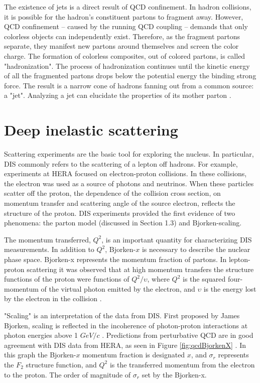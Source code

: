 The existence of jets is a direct result of QCD confinement. In hadron collisions, it is possible for the hadron's constituent partons to fragment away. However, QCD confinement -- caused by the running QCD coupling -- demands that only colorless objects can independently exist. Therefore, as the fragment partons separate, they manifest new partons around themselves and screen the color charge. The formation of colorless composites, out of colored partons, is called "hadronization". The process of hadronization continues until the kinetic energy of all the fragmented partons drops below the potential energy the binding strong force. The result is a narrow cone of hadrons fanning out from a common source: a "jet". Analyzing a jet can elucidate the properties of its mother parton \cite{d'Enterria:2004nv}.  

\section{Deep inelastic scattering}

Scattering experiments are the basic tool for exploring the nucleus. In particular, DIS commonly refers to the scattering of a lepton off hadrons. For example, experiments at HERA focused on electron-proton collisions. In these collisions, the electron was used as a source of photons and neutrinos. When these particles scatter off the proton, the dependence of the collision cross section, on momentum transfer and scattering angle of the source electron, reflects the structure of the proton. DIS experiments provided the first evidence of two phenomena: the parton model (discussed in Section 1.3) and Bjorken-scaling. 

The momentum transferred, $Q^2$, is an important quantity for characterizing DIS measurements. In addition to $Q^2$, Bjorken-$x$ is necessary to describe the nuclear phase space. Bjorken-x represents the momentum fraction of partons. In lepton-proton scattering it was observed that at high momentum transfers the structure functions of the proton were functions of $Q^2/\upsilon$, where $Q^2$ is the squared four-momentum of the virtual photon emitted by the electron, and $\upsilon$ is the energy lost by the electron in the collision \cite{Bjorken:1968dy}. 

"Scaling" is an interpretation of the data from DIS. First proposed by James Bjorken, scaling is reflected in the incoherence of photon-proton interactions at photon energies above 1 $GeV/c$ \cite{Bjorken:1982qr}. Predictions from perturbative QCD are in good agreement with DIS data from HERA, as seen in Figure \ref{fig:qcdBjorkenX} \cite{Shimizu:2009fc}. In this graph the Bjorken-$x$ momentum fraction is designated $x$, and $\sigma_r$ represents the $F_2$ structure function, and $Q^2$ is the transferred momentum from the electron to the proton. The order of magnitude of $\sigma_r$ set by the Bjorken-x.

